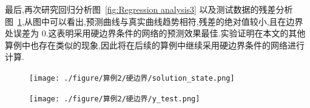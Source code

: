 \documentclass{Sichuan Normal University}
\begin{document}
最后,再次研究回归分析图~\ref{fig:Regression analysis3} 以及测试数据的残差分析图~\ref{fig:Residual analysis3},从图中可以看出,预测曲线与真实曲线趋势相符,残差的绝对值较小,且在边界处误差为 $0$.这表明采用硬边界条件的网络的预测效果最佳.实验证明在本文的其他算例中也存在类似的现象,因此将在后续的算例中继续采用硬边界条件的网络进行计算.
\begin{figure}[H]
    \centering
    \begin{minipage}[c]{0.48\textwidth}
    \centering
    \texttt{[image: ./figure/算例2/硬边界/solution\_state.png]}
    \end{minipage}
    \hspace{0.02\textwidth}
    \begin{minipage}[c]{0.48\textwidth}
    \centering
    \texttt{[image: ./figure/算例2/硬边界/y\_test.png]}
    \end{minipage}\\[3mm]
    \begin{minipage}[t]{0.48\textwidth}
    \centering
    \label{fig:Regression analysis3}
    \end{minipage}
    \hspace{0.02\textwidth}
    \begin{minipage}[t]{0.48\textwidth}
    \centering
    \label{fig:Residual analysis3}
    \end{minipage}
    \end{figure}
    


\end{document}
